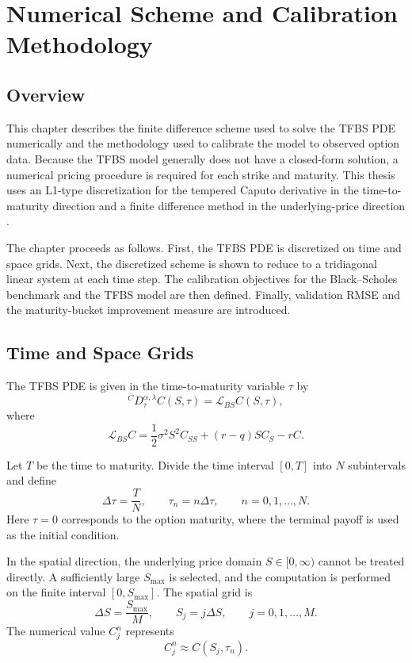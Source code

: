 \documentclass[11pt,a4paper]{report}
\begin{document}
\chapter{Numerical Scheme and Calibration Methodology}

\section{Overview}

This chapter describes the finite difference scheme used to solve the TFBS PDE numerically and the methodology used to calibrate the model to observed option data. Because the TFBS model generally does not have a closed-form solution, a numerical pricing procedure is required for each strike and maturity. This thesis uses an L1-type discretization for the tempered Caputo derivative in the time-to-maturity direction and a finite difference method in the underlying-price direction \cite{SabzikarMeerschaertChen2015}.

The chapter proceeds as follows. First, the TFBS PDE is discretized on time and space grids. Next, the discretized scheme is shown to reduce to a tridiagonal linear system at each time step. The calibration objectives for the Black--Scholes benchmark and the TFBS model are then defined. Finally, validation RMSE and the maturity-bucket improvement measure are introduced.

\section{Time and Space Grids}

The TFBS PDE is given in the time-to-maturity variable $\tau$ by
\[
{}^C D_\tau^{\alpha,\lambda} C(S,\tau)
=
\mathcal{L}_{BS}C(S,\tau),
\]
where
\[
\mathcal{L}_{BS}C
=
\frac{1}{2}\sigma^2S^2C_{SS}
+
(r-q)SC_S
-
rC.
\]

Let $T$ be the time to maturity. Divide the time interval $[0,T]$ into $N$ subintervals and define
\[
\Delta \tau = \frac{T}{N},
\qquad
\tau_n = n\Delta \tau,
\qquad n=0,1,\dots,N.
\]
Here $\tau=0$ corresponds to the option maturity, where the terminal payoff is used as the initial condition.

In the spatial direction, the underlying price domain $S\in[0,\infty)$ cannot be treated directly. A sufficiently large $S_{\max}$ is selected, and the computation is performed on the finite interval $[0,S_{\max}]$. The spatial grid is
\[
\Delta S = \frac{S_{\max}}{M},
\qquad
S_j=j\Delta S,
\qquad j=0,1,\dots,M.
\]
The numerical value $C_j^n$ represents
\[
C_j^n \approx C(S_j,\tau_n).
\]
\end{document}
